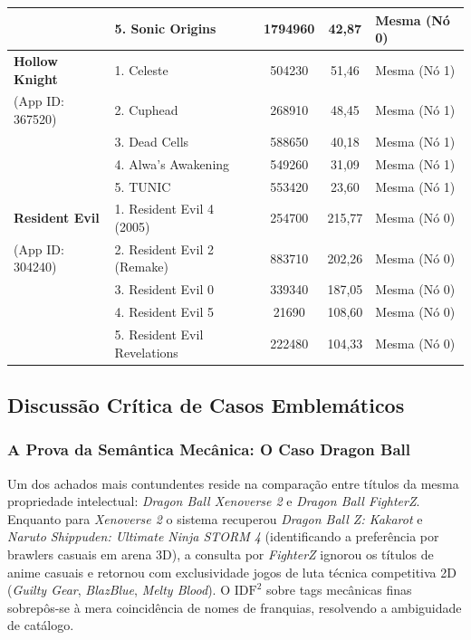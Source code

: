 \documentclass[conference]{IEEEtran}
\begin{document}
\begin{table}[htbp]
\begin{tabular}{l l c c l}
& 5. Sonic Origins & 1794960 & 42,87 & Mesma (Nó 0) \\
\midrule
\textbf{Hollow Knight} & 1. Celeste & 504230 & 51,46 & Mesma (Nó 1) \\
(App ID: 367520) & 2. Cuphead & 268910 & 48,45 & Mesma (Nó 1) \\
& 3. Dead Cells & 588650 & 40,18 & Mesma (Nó 1) \\
& 4. Alwa's Awakening & 549260 & 31,09 & Mesma (Nó 1) \\
& 5. TUNIC & 553420 & 23,60 & Mesma (Nó 1) \\
\midrule
\textbf{Resident Evil} & 1. Resident Evil 4 (2005) & 254700 & 215,77 & Mesma (Nó 0) \\
(App ID: 304240) & 2. Resident Evil 2 (Remake) & 883710 & 202,26 & Mesma (Nó 0) \\
& 3. Resident Evil 0 & 339340 & 187,05 & Mesma (Nó 0) \\
& 4. Resident Evil 5 & 21690 & 108,60 & Mesma (Nó 0) \\
& 5. Resident Evil Revelations & 222480 & 104,33 & Mesma (Nó 0) \\
\bottomrule
\end{tabular}
\label{tab:benchmarks_expandida}
\end{table}

\subsection{Discussão Crítica de Casos Emblemáticos}

\subsubsection{A Prova da Semântica Mecânica: O Caso Dragon Ball}
Um dos achados mais contundentes reside na comparação entre títulos da mesma propriedade intelectual: \textit{Dragon Ball Xenoverse 2} e \textit{Dragon Ball FighterZ}. Enquanto para \textit{Xenoverse 2} o sistema recuperou \textit{Dragon Ball Z: Kakarot} e \textit{Naruto Shippuden: Ultimate Ninja STORM 4} (identificando a preferência por brawlers casuais em arena 3D), a consulta por \textit{FighterZ} ignorou os títulos de anime casuais e retornou com exclusividade jogos de luta técnica competitiva 2D (\textit{Guilty Gear}, \textit{BlazBlue}, \textit{Melty Blood}). O $\text{IDF}^2$ sobre tags mecânicas finas sobrepôs-se à mera coincidência de nomes de franquias, resolvendo a ambiguidade de catálogo.
\end{document}

